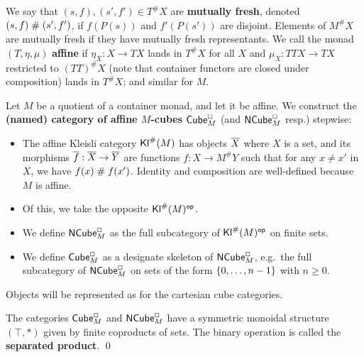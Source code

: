 \documentclass[a4paper]{memoir}
\begin{document}
We say that $(s, f), (s', f') \in T^\# X$ are \textbf{mutually fresh}, denoted $(s, f) \mathrel{\#} (s', f')$, if $f(P(s))$ and $f'(P(s'))$ are disjoint.
Elements of $M^\# X$ are mutually fresh if they have mutually fresh representants.
We call the monad $(T, \eta, \mu)$ \textbf{affine} if $\eta_X : X \to TX$ lands in $T^\# X$ for all $X$ and $\mu_X : TTX \to TX$ restricted to $(TT)^\# X$ (note that container functors are closed under composition) lands in $T^\# X$; and similar for $M$.

\begin{definition}
Let $M$ be a quotient of a container monad, and let it be affine.
We construct the \textbf{(named) category of affine $M$-cubes ${\mathsf{Cube}}_M^\Box$} (and ${\mathsf{NCube}}_M^\Box$ resp.) stepwise:
\begin{itemize}
	\item The affine Kleisli category ${\mathsf{Kl}}^\#(M)$ has objects ${\overline{X}}$ where $X$ is a set, and its morphisms ${\overline{f}} : {\overline{X}} \to {\overline{Y}}$ are functions $f : X \to M^\#Y$ such that for any $x \neq x'$ in $X$, we have $f(x) \mathrel{\#} f(x')$.
	Identity and composition are well-defined because $M$ is affine.
	\item Of this, we take the opposite ${\mathsf{Kl}}^\#(M)^{\mathsf{op}}$.
	\item We define ${\mathsf{NCube}}_M^\Box$ as the full subcategory of ${\mathsf{Kl}}^\#(M)^{\mathsf{op}}$ on finite sets.
	\item We define ${\mathsf{Cube}}_M^\Box$ as a designate skeleton of ${\mathsf{NCube}}^\Box_M$, e.g.\ the full subcategory of ${\mathsf{NCube}}^\Box_M$ on sets of the form $\mathopen{}\left\{ 0, \ldots, n-1 \right\}\mathclose{}$ with $n \geq 0$.
\end{itemize}
\end{definition}
Objects will be represented as for the cartesian cube categories.

\begin{corollary}
The categories ${\mathsf{Cube}}^\Box_M$ and ${\mathsf{NCube}}^\Box_M$ have a symmetric monoidal structure $(\top, {*})$ given by finite coproducts of sets. The binary operation is called the \textbf{separated product}. \qed
\end{corollary}
\end{document}
